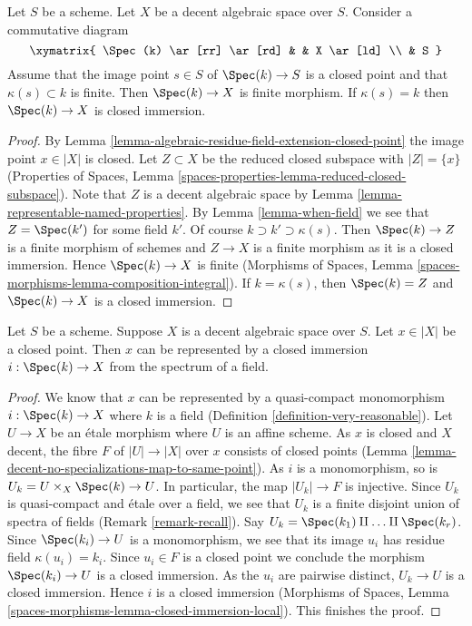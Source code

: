 \begin{lemma}
\label{lemma-finite-residue-field-extension-finite}
Let $S$ be a scheme. Let $X$ be a decent algebraic space over $S$.
Consider a commutative diagram
$$
\xymatrix{
\Spec(k) \ar[rr] \ar[rd] & & X \ar[ld] \\
& S
}
$$
Assume that the image point $s \in S$ of $\Spec(k) \to S$ is
a closed point and that $\kappa(s) \subset k$ is finite.
Then $\Spec(k) \to X$ is finite morphism. If $\kappa(s) = k$
then $\Spec(k) \to X$ is closed immersion.
\end{lemma}

\begin{proof}
By Lemma \ref{lemma-algebraic-residue-field-extension-closed-point}
the image point $x \in |X|$ is closed. Let $Z \subset X$ be the
reduced closed subspace with $|Z| = \{x\}$ (Properties of Spaces,
Lemma \ref{spaces-properties-lemma-reduced-closed-subspace}).
Note that $Z$ is a decent algebraic space by
Lemma \ref{lemma-representable-named-properties}.
By Lemma \ref{lemma-when-field} we see that $Z = \Spec(k')$
for some field $k'$. Of course $k \supset k' \supset \kappa(s)$.
Then $\Spec(k) \to Z$ is a finite morphism of schemes
and $Z \to X$ is a finite morphism as it is a closed immersion.
Hence $\Spec(k) \to X$ is finite (Morphisms of Spaces, Lemma
\ref{spaces-morphisms-lemma-composition-integral}).
If $k = \kappa(s)$, then $\Spec(k) = Z$ and $\Spec(k) \to X$
is a closed immersion.
\end{proof}

\begin{lemma}
\label{lemma-decent-space-closed-point}
Let $S$ be a scheme. Suppose $X$ is a decent algebraic space over $S$.
Let $x \in |X|$ be a closed point. Then $x$ can be represented by a
closed immersion $i : \Spec(k) \to X$ from the spectrum of a field.
\end{lemma}

\begin{proof}
We know that $x$ can be represented by a quasi-compact monomorphism
$i : \Spec(k) \to X$ where $k$ is a field
(Definition \ref{definition-very-reasonable}).
Let $U \to X$ be an \'etale morphism where $U$ is an affine scheme.
As $x$ is closed and $X$ decent, the fibre $F$ of $|U| \to |X|$ over $x$
consists of closed points
(Lemma \ref{lemma-decent-no-specializations-map-to-same-point}).
As $i$ is a monomorphism, so is $U_k = U \times_X \Spec(k) \to U$.
In particular, the map $|U_k| \to F$ is injective. Since $U_k$
is quasi-compact and \'etale over a field, we see that $U_k$ is a
finite disjoint union of spectra of fields (Remark \ref{remark-recall}).
Say $U_k = \Spec(k_1) \amalg \ldots \amalg \Spec(k_r)$.
Since $\Spec(k_i) \to U$ is a monomorphism, we see that
its image $u_i$ has residue field $\kappa(u_i) = k_i$.
Since $u_i \in F$ is a closed point we conclude the morphism
$\Spec(k_i) \to U$ is a closed immersion. As the $u_i$ are pairwise distinct,
$U_k \to U$ is a closed immersion. Hence $i$ is a closed immersion
(Morphisms of Spaces, Lemma
\ref{spaces-morphisms-lemma-closed-immersion-local}). This finishes the proof.
\end{proof}





